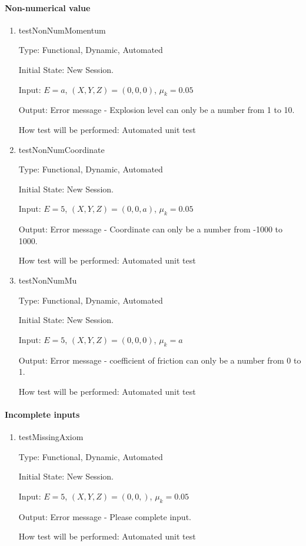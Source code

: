\documentclass[12pt, titlepage]{article}
\begin{document}
\paragraph{Non-numerical value}

\begin{enumerate}

\item{testNonNumMomentum\\}

Type: Functional, Dynamic, Automated

Initial State: New Session.

Input: $E = a$, $(X,Y,Z) = (0,0,0)$, $\mu_{k} = 0.05$  

Output: Error message - Explosion level can only be a number from 1 to 10.

How test will be performed: Automated unit test

\item{testNonNumCoordinate\\}

Type: Functional, Dynamic, Automated

Initial State: New Session.

Input: $E = 5$, $(X,Y,Z) = (0,0,a)$, $\mu_{k} = 0.05$  

Output: Error message - Coordinate can only be a number from -1000 to 1000.

How test will be performed: Automated unit test

\item{testNonNumMu\\}

Type: Functional, Dynamic, Automated

Initial State: New Session.

Input: $E = 5$, $(X,Y,Z) = (0,0,0)$, $\mu_{k} = a$  

Output: Error message - coefficient of friction can only be a number from 0 to 1.

How test will be performed: Automated unit test

\end{enumerate}

\paragraph{Incomplete inputs}

\begin{enumerate}

\item{testMissingAxiom\\}

Type: Functional, Dynamic, Automated

Initial State: New Session.

Input: $E = 5$, $(X,Y,Z) = (0,0,)$, $\mu_{k} = 0.05$  

Output: Error message - Please complete input.

How test will be performed: Automated unit test 

\end{enumerate}
\end{document}
